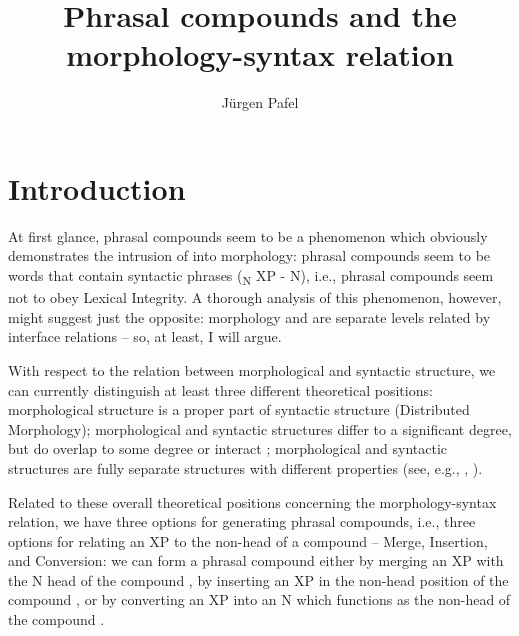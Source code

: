 \documentclass[output=paper]{LSP/langsci}
\author{Jürgen Pafel\affiliation{Universität Stuttgart} }
\title{Phrasal compounds and the morphology-syntax relation}
\begin{document}
\section{Introduction} 
At first glance, phrasal compounds seem to be a phenomenon which
obviously demonstrates the intrusion of  into morphology:
phrasal compounds seem to be words that contain syntactic phrases
({\ob}\textsubscript{N} XP - N{\cb}), i.e., phrasal compounds seem not
to obey Lexical Integrity. A thorough analysis of this phenomenon,
however, might suggest just the opposite: morphology and  are
separate levels related by interface relations – so, at least, I will
argue.

With respect to the relation between morphological and syntactic structure, we can currently distinguish at least three different theoretical positions: morphological structure is a proper part of syntactic structure (Distributed Morphology); morphological and syntactic structures differ to a significant degree, but do overlap to some degree or interact \citep {AN04, LS06}; morphological and syntactic structures are fully separate structures with different properties (see, e.g., \citealt{Bresnan2001}, \citealt{Spencer2010}).
 
Related to these overall theoretical positions concerning the morphology-syn\-tax relation, we have three options for generating phrasal compounds, i.e., three options for relating an XP to the non-head of a compound – Merge, Insertion, and Conversion: we can form a phrasal compound either by merging an XP with the N head of the compound \citep {Lawrenz2006, LS06, Hein2015}, by inserting an XP in the non-head position of the compound \citep {AN04, Sato2010}, or by converting an XP into an N which functions as the non-head of the compound \citep {Harley2009, Pafel2015}.
 
\end{document}
